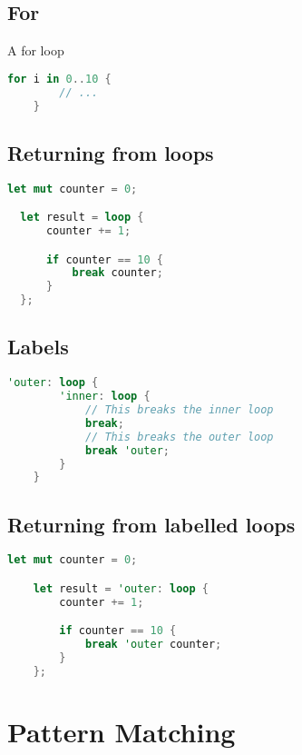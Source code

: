 \documentclass{article}
\begin{document}
\subsection{For}

A for loop

\begin{lstlisting}[language=Rust, style=boxed, numbers=none]
    for i in 0..10 {
        // ...
    }
\end{lstlisting}

\subsection{Returning from loops}

\begin{lstlisting}[language=Rust, style=boxed, numbers=none]
  let mut counter = 0;

  let result = loop {
      counter += 1;

      if counter == 10 {
          break counter;
      }
  };
\end{lstlisting}

\subsection{Labels}

\begin{lstlisting}[language=Rust, style=boxed, numbers=none]
    'outer: loop {
        'inner: loop {
            // This breaks the inner loop
            break;
            // This breaks the outer loop
            break 'outer;
        }
    }
\end{lstlisting}

\subsection{Returning from labelled loops}

\begin{lstlisting}[language=Rust, style=boxed, numbers=none]
    let mut counter = 0;

    let result = 'outer: loop {
        counter += 1;

        if counter == 10 {
            break 'outer counter;
        }
    };
\end{lstlisting}

\section{Pattern Matching}
\end{document}
